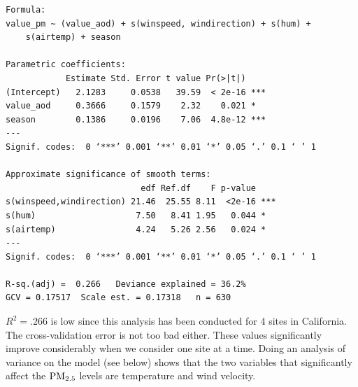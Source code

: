 \documentclass[10pt]{article}
\begin{document}
\begin{itemize}
\begin{verbatim}
Formula:
value_pm ~ (value_aod) + s(winspeed, windirection) + s(hum) + 
    s(airtemp) + season

Parametric coefficients:
            Estimate Std. Error t value Pr(>|t|)    
(Intercept)   2.1283     0.0538   39.59  < 2e-16 ***
value_aod     0.3666     0.1579    2.32    0.021 *  
season        0.1386     0.0196    7.06  4.8e-12 ***
---
Signif. codes:  0 ‘***’ 0.001 ‘**’ 0.01 ‘*’ 0.05 ‘.’ 0.1 ‘ ’ 1

Approximate significance of smooth terms:
                           edf Ref.df    F p-value    
s(winspeed,windirection) 21.46  25.55 8.11  <2e-16 ***
s(hum)                    7.50   8.41 1.95   0.044 *  
s(airtemp)                4.24   5.26 2.56   0.024 *  
---
Signif. codes:  0 ‘***’ 0.001 ‘**’ 0.01 ‘*’ 0.05 ‘.’ 0.1 ‘ ’ 1

R-sq.(adj) =  0.266   Deviance explained = 36.2%
GCV = 0.17517  Scale est. = 0.17318   n = 630
\end{verbatim} 

$R^2 = .266$ is low since this analysis has been conducted for 4 sites in California. The cross-validation error is not too bad either. These values significantly improve considerably when we consider one site at a time. Doing an analysis of variance on the model (see below) shows that the two variables that significantly affect the ${\mathrm{PM_{2.5}}}$ levels are temperature and wind velocity. \newpage








\end{itemize}
\end{document}
